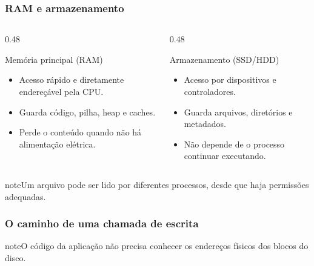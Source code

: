 \documentclass[aspectratio=169,11pt]{beamer}
\begin{document}
\begin{frame}
\frametitle{RAM e armazenamento}
\begin{columns}[T,onlytextwidth]
\begin{column}{0.48\textwidth}
\begin{block}{Memória principal (RAM)}\small\begin{itemize}
\item Acesso rápido e diretamente endereçável pela CPU.
\item Guarda código, pilha, heap e caches.
\item Perde o conteúdo quando não há alimentação elétrica.
\end{itemize}\end{block}\end{column}
\begin{column}{0.48\textwidth}
\begin{block}{Armazenamento (SSD/HDD)}\small\begin{itemize}
\item Acesso por dispositivos e controladores.
\item Guarda arquivos, diretórios e metadados.
\item Não depende de o processo continuar executando.
\end{itemize}\end{block}\end{column}\end{columns}
\vfill\begin{beamercolorbox}[wd=\textwidth,sep=2mm,rounded=true]{note}\small Um arquivo pode ser lido por diferentes processos, desde que haja permissões adequadas.\end{beamercolorbox}

\end{frame}

\begin{frame}
\frametitle{O caminho de uma chamada de escrita}
\begin{center}\end{center}
\vfill\begin{beamercolorbox}[wd=\textwidth,sep=2mm,rounded=true]{note}\small O código da aplicação não precisa conhecer os endereços físicos dos blocos do disco.\end{beamercolorbox}
\end{frame}
\end{document}
